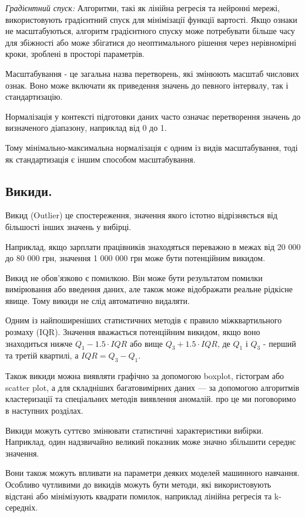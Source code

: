 \textit{Градієнтний спуск:} Алгоритми, такі як лінійна регресія та нейронні мережі, використовують 
градієнтний спуск для мінімізації функції вартості. Якщо ознаки не масштабуються, алгоритм 
градієнтного спуску може потребувати більше часу для збіжності або може збігатися до 
неоптимального рішення через нерівномірні кроки, зроблені в просторі параметрів.

Масштабування - це загальна назва перетворень, які змінюють масштаб числових ознак. Воно може включати як приведення значень до певного інтервалу, так і стандартизацію.

Нормалізація у контексті підготовки даних часто означає перетворення значень до визначеного діапазону, наприклад від 0 до 1.

Тому мінімально-максимальна нормалізація є одним із видів масштабування, тоді як стандартизація є іншим способом масштабування.

\subsection{Викиди.}

Викид (Outlier) це спостереження, значення якого істотно відрізняється від більшості інших значень у вибірці.

Наприклад, якщо зарплати працівників знаходяться переважно в межах від 20 000 до 80 000 грн, значення 1 000 000 грн може бути потенційним викидом.

Викид не обов'язково є помилкою. Він може бути результатом помилки вимірювання або введення даних, але також може відображати реальне рідкісне явище. Тому викиди не слід автоматично видаляти.

Одним із найпоширеніших статистичних методів є правило міжквартильного розмаху (IQR). Значення вважається потенційним викидом, якщо воно знаходиться нижче $Q_{1} - 1.5 \cdot IQR$ або вище $Q_{3} + 1.5 \cdot IQR$, де $Q_{1}$ і $Q_{3}$ - перший та третій квартилі, а $IQR = Q_{3} - Q_{1}$. 

Також викиди можна виявляти графічно за допомогою boxplot, гістограм або scatter plot, а для складніших багатовимірних даних — за допомогою алгоритмів кластеризації та спеціальних методів виявлення аномалій. про це ми поговоримо в наступних розділах.

Викиди можуть суттєво змінювати статистичні характеристики вибірки. Наприклад, один надзвичайно великий показник може значно збільшити середнє значення.

Вони також можуть впливати на параметри деяких моделей машинного навчання. Особливо чутливими до викидів можуть бути методи, які використовують відстані або мінімізують квадрати помилок, наприклад лінійна регресія та k-середніх.

